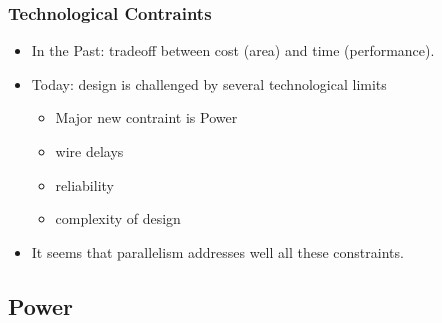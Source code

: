 \documentclass{beamer}
\newcommand{\emphh}[1]{\textcolor{CosGreen}{ #1}}
\begin{document}
\begin{frame}[fragile,t]
\frametitle{Technological Contraints}

\begin{itemize}
    \item In the Past: tradeoff between cost (area) and time (performance).\bigskip

    \item Today: design is challenged by several technological limits\smallskip
        \begin{itemize} 
            \item \alert{Major new contraint is Power}\smallskip
            \item wire delays\smallskip
            \item reliability\smallskip
            \item complexity of design
        \end  {itemize}\bigskip

    \item \emphh{It seems that parallelism addresses well all these constraints.} 

\end{itemize}
\end{frame}

\subsection{Power}
\end{document}
